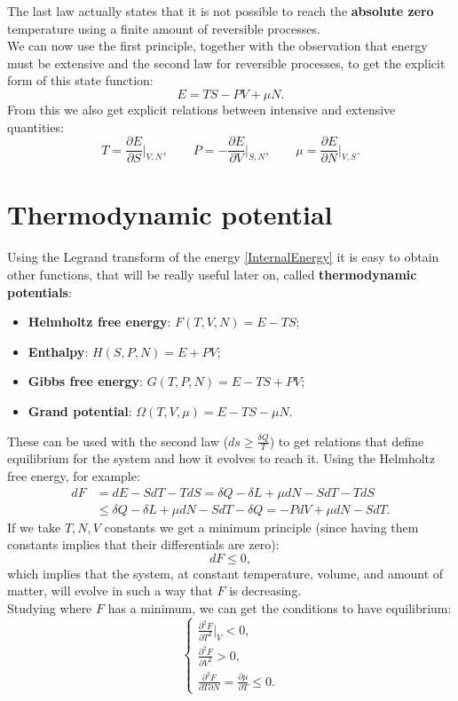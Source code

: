 The last law actually states that it is not possible to reach the \textbf{absolute zero} temperature using a finite amount of reversible processes.\\
We can now use the first principle, together with the observation that energy must be extensive and the second law for reversible processes, to get the explicit form of this state function:
\begin{equation}
    \label{InternalEnergy} E=TS-PV+\mu N.
\end{equation}
From this we also get explicit relations between intensive and extensive quantities:
\begin{equation}
    T=\frac{\partial E}{\partial S}\bigg|_{V,N},\qquad P=-\frac{\partial E}{\partial V}\bigg|_{S,N},\qquad \mu=\frac{\partial E}{\partial N}\bigg|_{V,S}.
\end{equation}
\section{Thermodynamic potential}
Using the Legrand transform of the energy \eqref{InternalEnergy} it is easy to obtain other functions, that will be really useful later on, called \textbf{thermodynamic potentials}:
\begin{itemize}
    \item \textbf{Helmholtz free energy}: $F(T,V,N)=E-TS$;
    \item \textbf{Enthalpy}: $H(S,P,N)=E+PV$;
    \item \textbf{Gibbs free energy}: $G(T,P,N)=E-TS+PV$;
    \item \textbf{Grand potential}: $\Omega(T,V,\mu)=E-TS-\mu N$.
\end{itemize} 
These can be used with the second law ($ds\geq\frac{\delta Q}{T}$) to get relations that define equilibrium for the system and how it evolves to reach it.
Using the Helmholtz free energy, for example:
\begin{align*}
    dF&=dE-SdT-TdS=\delta Q-\delta L+\mu dN-SdT-TdS\\
    &\leq\delta Q-\delta L+\mu dN-SdT-\delta Q=-PdV+\mu dN-SdT.
\end{align*}
If we take $T,N,V$ constants we get a minimum principle (since having them constants implies that their differentials are zero):
\begin{equation*}
    dF\leq0,
\end{equation*}
which implies that the system, at constant temperature, volume, and amount of matter, will evolve in such a way that $F$ is decreasing.\\
Studying where $F$ has a minimum, we can get the conditions to have equilibrium:
\begin{equation*}
    \begin{cases}
        \frac{\partial^2F}{\partial T^2}\big|_V<0,\\
        \frac{\partial^2F}{\partial V^2}>0,\\
        \frac{\partial^2F}{\partial T\partial N}=\frac{\partial \mu}{\partial T}\leq0.
    \end{cases}
\end{equation*}